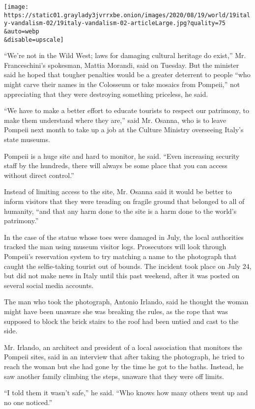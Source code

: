 \texttt{[image: https://static01.graylady3jvrrxbe.onion/images/2020/08/19/world/19italy-vandalism-02/19italy-vandalism-02-articleLarge.jpg?quality=75\\\&auto=webp\\\&disable=upscale]}

``We're not in the Wild West; laws for damaging cultural heritage do
exist,'' Mr. Franceschini's spokesman, Mattia Morandi, said on Tuesday.
But the minister said he hoped that tougher penalties would be a greater
deterrent to people ``who might carve their names in the Colosseum or
take mosaics from Pompeii,'' not appreciating that they were destroying
something priceless, he said.

``We have to make a better effort to educate tourists to respect our
patrimony, to make them understand where they are,'' said Mr. Osanna,
who is to leave Pompeii next month to take up a job at the Culture
Ministry overseeing Italy's state museums.

Pompeii is a huge site and hard to monitor, he said. ``Even increasing
security staff by the hundreds, there will always be some place that you
can access without direct control.''

Instead of limiting access to the site, Mr. Osanna said it would be
better to inform visitors that they were treading on fragile ground that
belonged to all of humanity, ``and that any harm done to the site is a
harm done to the world's patrimony.''

In the case of the statue whose toes were damaged in July, the local
authorities tracked the man using museum visitor logs. Prosecutors will
look through Pompeii's reservation system to try matching a name to the
photograph that caught the selfie-taking tourist out of bounds. The
incident took place on July 24, but did not make news in Italy until
this past weekend, after it was posted on several social media accounts.

The man who took the photograph, Antonio Irlando, said he thought the
woman might have been unaware she was breaking the rules, as the rope
that was supposed to block the brick stairs to the roof had been untied
and cast to the side.

Mr. Irlando, an architect and president of a local association that
monitors the Pompeii sites, said in an interview that after taking the
photograph, he tried to reach the woman but she had gone by the time he
got to the baths. Instead, he saw another family climbing the steps,
unaware that they were off limits.

``I told them it wasn't safe,'' he said. ``Who knows how many others
went up and no one noticed.''

